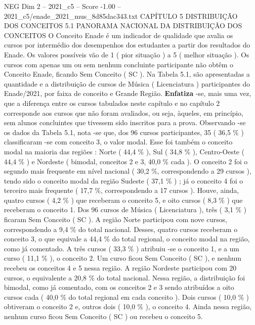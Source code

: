 \begin{textsample}{NEG Dim 2 – 2021\_c5 – Score -1.00 – 2021\_c5/enade\_2021\_mus\_8d85dac343.txt}  \label{ex:f2_neg_146}
CAPÍTULO 5 DISTRIBUIÇÃO DOS CONCEITOS 5.1 PANORAMA NACIONAL DA DISTRIBUIÇÃO DOS CONCEITOS O Conceito Enade é um indicador de qualidade que avalia os cursos por intermédio dos desempenhos dos estudantes a partir dos resultados do Enade.
Os valores possíveis vão de 1 ( pior situação ) a 5 ( melhor situação ).
Os cursos com apenas um ou sem nenhum concluinte participante não obtêm o Conceito Enade, ficando Sem Conceito ( SC ).
Na Tabela 5.1, são apresentadas a quantidade e a distribuição de cursos de Música ( Licenciatura ) participantes do Enade/2021, por faixa de conceito e Grande Região. \textbf{Enfatiza} -se, mais uma vez, que a diferença entre os cursos tabulados neste capítulo e no capítulo 2 corresponde aos cursos que não foram avaliados, ou seja, àqueles, em princípio, sem alunos concluintes que tivessem sido inscritos para a prova.
Observando -se os dados da Tabela 5.1, nota -se que, dos 96 cursos participantes, 35 ( 36,5 \% ) classificaram -se com conceito 3, o valor modal.
Esse foi também o conceito modal na maioria das regiões : Norte ( 44,4 \% ), Sul ( 34,8 \% ), Centro-Oeste ( 44,4 \% ) e Nordeste ( bimodal, conceitos 2 e 3, 40,0 \% cada ).
O conceito 2 foi o segundo mais frequente em nível nacional ( 30,2 \%, correspondendo a 29 cursos ), tendo sido o conceito modal da região Sudeste ( 37,1 \% ) ; já o conceito 4 foi o terceiro mais frequente ( 17,7 \%, correspondendo a 17 cursos ).
Houve, ainda, quatro cursos ( 4,2 \% ) que receberam o conceito 5, e oito cursos ( 8,3 \% ) que receberam o conceito 1.
Dos 96 cursos de Música ( Licenciatura ), três ( 3,1 \% ) ficaram Sem Conceito ( SC ).
A região Norte participou com nove cursos, correspondendo a 9,4 \% do total nacional.
Desses, quatro cursos receberam o conceito 3, o que equivale a 44,4 \% do total regional, o conceito modal na região, como já comentado.
A três cursos ( 33,3 \% ) atribuiu -se o conceito 1, e a um curso ( 11,1 \% ), o conceito 2.
Um curso ficou Sem Conceito ( SC ), e nenhum recebeu os conceitos 4 e 5 nessa região.
A região Nordeste participou com 20 cursos, o equivalente a 20,8 \% do total nacional.
Nessa região, a distribuição foi bimodal, como já comentado, com os conceitos 2 e 3 sendo atribuídos a oito cursos cada ( 40,0 \% do total regional em cada conceito ).
Dois cursos ( 10,0 \% ) obtiveram o conceito 2 e, outros dois ( 10,0 \% ), o conceito 4.
Ainda nessa região, nenhum curso ficou Sem Conceito ( SC ) ou recebeu o conceito 5.

\end{textsample}
